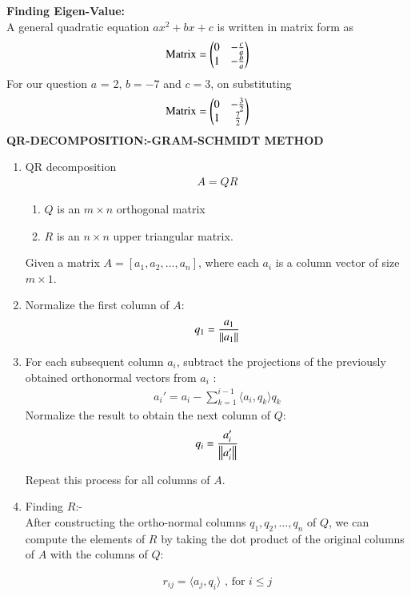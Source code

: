 \documentclass[journal]{IEEEtran}
\begin{document}
\textbf{Finding Eigen-Value: } \\ 
A general quadratic equation $ax^2 + bx + c$ is written in matrix form as 
\begin{align}
    \text{Matrix} = \begin{pmatrix}0 & -\frac{c}{a} \\ 1 & -\frac{b}{a}\end{pmatrix}
\end{align}
For our question $a$ = 2, $b = -7$ and $c = 3$, on substituting
\begin{align}
    \text{Matrix} = \begin{pmatrix}0 & -\frac{3}{2} \\ 1 & \frac{7}{2}\end{pmatrix}
\end{align}
\textbf{QR-DECOMPOSITION:-GRAM-SCHMIDT METHOD}\\
\begin{enumerate}

\item QR decomposition 
\begin{align}
A = QR
\end{align}
\begin{enumerate}
    \item $Q$ is an $ m \times n $ orthogonal matrix
    \item $R$ is an $n \times n$ upper triangular matrix.
\end{enumerate}
Given a matrix $ A = [a_1, a_2, \dots, a_n] $, where each $ a_i $ is a column vector of size $ m \times 1 $.

\item Normalize the first column of $A$:
\begin{align}
q_1 = \frac{a_1}{\left\lVert a_1\right\rVert}
\end{align}

\item  For each subsequent column $ a_i $, subtract the projections of the previously obtained orthonormal vectors from $ a_i $ :
\begin{align}
a_i' = a_i - \sum_{k=1}^{i-1} \langle a_i, q_k \rangle q_k
\end{align}
Normalize the result to obtain the next column of \( Q \):
\begin{align}
q_i = \frac{a_i'}{\left\lVert a_i'\right\rVert}
\end{align}

Repeat this process for all columns of \( A \).

\item Finding $R$:- \\
After constructing the ortho-normal columns $ q_1, q_2, \dots, q_n $ of $Q$, we can compute the elements of $R$ by taking the dot product of the original columns of $A$ with the columns of $Q$:

\begin{align}
    r_{ij} = \langle a_j, q_i \rangle \text{ , for  }  i \leq j 
\end{align}
\end{enumerate}
\end{document}
